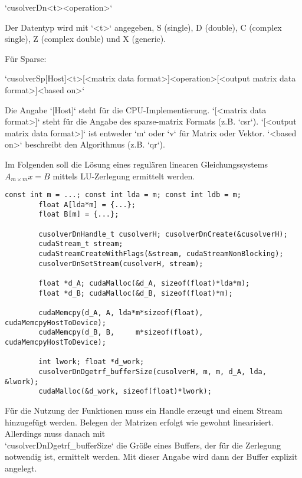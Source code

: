 		\li`cusolverDn<t><operation>` 

		Der Datentyp wird mit \li`<t>` angegeben, S (single), D (double), C (complex single), Z (complex double) und X (generic). 
		
		Für Sparse:
		
		\li`cusolverSp[Host]<t>[<matrix data format>]<operation>[<output matrix data format>]<based on>`
		
		Die Angabe \li`[Host]` steht für die CPU-Implementierung. \li`[<matrix data format>]` steht für die Angabe des sparse-matrix Formats (z.B. \li`csr`). \li`[<output matrix data format>]` ist entweder \li`m` oder \li`v` für Matrix oder Vektor. \li`<based on>` beschreibt den Algorithmus (z.B. \li`qr`).
		
		Im Folgenden soll die Lösung eines regulären linearen Gleichungssystems $A_{m\times m}x=B$ mittels LU-Zerlegung ermittelt werden.
		
		\begin{lstlisting}[caption=cuSOLVER: Buffer]
		const int m = ...; const int lda = m; const int ldb = m;
		float A[lda*m] = {...};
		float B[m] = {...};    

		cusolverDnHandle_t cusolverH; cusolverDnCreate(&cusolverH);
		cudaStream_t stream;
		cudaStreamCreateWithFlags(&stream, cudaStreamNonBlocking);
		cusolverDnSetStream(cusolverH, stream);

		float *d_A; cudaMalloc(&d_A, sizeof(float)*lda*m);
		float *d_B; cudaMalloc(&d_B, sizeof(float)*m);

		cudaMemcpy(d_A, A, lda*m*sizeof(float), cudaMemcpyHostToDevice);
		cudaMemcpy(d_B, B,     m*sizeof(float), cudaMemcpyHostToDevice);

		int lwork; float *d_work; 
		cusolverDnDgetrf_bufferSize(cusolverH, m, m, d_A, lda, &lwork);
		cudaMalloc(&d_work, sizeof(float)*lwork);
		\end{lstlisting}
		
		Für die Nutzung der Funktionen muss ein \Gls{Handle} erzeugt und einem \Gls{Stream} hinzugefügt werden. Belegen der Matrizen erfolgt wie gewohnt linearisiert. Allerdings muss danach mit \\ \li`cusolverDnDgetrf_bufferSize` die Größe eines Buffers, der für die Zerlegung notwendig ist, ermittelt werden. Mit dieser Angabe wird dann der Buffer explizit angelegt.
		
